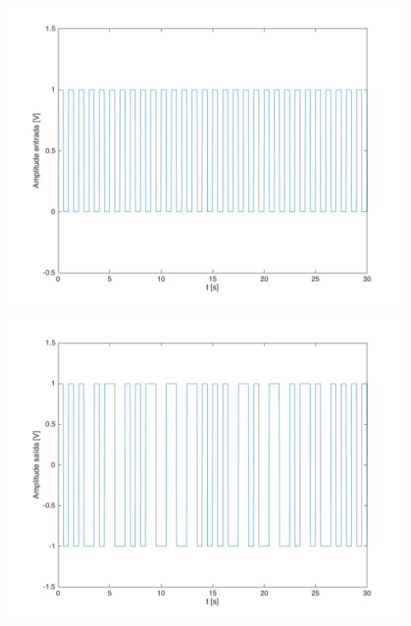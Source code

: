\documentclass[a4paper,11pt]{report}
\begin{document}
\begin{minipage}[t]{0.5\textwidth}
  \includegraphics[angle=0,width=1\textwidth]{grafico_5_1_1.png}
     \label{fig:grafico_5_1_1}
     \end{minipage}%
\hspace{0.3cm}
\begin{minipage}[t]{0.5\textwidth}
  \includegraphics[angle=0,width=1\textwidth]{grafico_5_1_2.png}
     \label{fig:grafico_5_1_2}
     \end{minipage}\\
     
\end{document}

